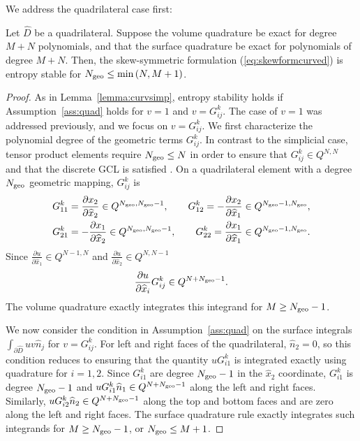 \documentclass{svjour3}                     %
\renewcommand{\hat}{\widehat}
\newcommand{\pd}[2]{\frac{\partial#1}{\partial#2}}
\newcommand{\LRp}[1]{\left( #1 \right)}
\begin{document}
We address the quadrilateral case first:
\begin{lemma}
Let $\hat{D}$ be a quadrilateral.  Suppose the volume quadrature be exact for degree $M+N$ polynomials, and that the surface quadrature be exact for polynomials of degree $M+N$.  Then, the skew-symmetric formulation (\ref{eq:skewformcurved}) is entropy stable for $N_{\rm geo} \leq \min\LRp{N,M+1}$.
\label{lemma:curvquad}
\end{lemma}
\begin{proof}
As in Lemma~\ref{lemma:curvsimp}, entropy stability holds if Assumption~\ref{ass:quad} holds for $v = 1$ and $v = G^k_{ij}$.  The case of $v = 1$ was addressed previously, and we focus on $v = G^k_{ij}$.  We first characterize the polynomial degree of the geometric terms $G^k_{ij}$.  In contrast to the simplicial case, tensor product elements require $N_{\rm geo}\leq N$ in order to ensure that $G^k_{ij}\in Q^{N,N}$ and that the discrete GCL is satisfied \cite{kopriva2006metric}.  On a quadrilateral element with a degree $N_{\rm geo}$ geometric mapping, $G^k_{ij}$ is
\begin{align*}
G^k_{11} &= \pd{x_2}{\hat{x}_2} \in Q^{N_{\rm geo}, N_{\rm geo}-1}, \qquad G^k_{12} = -\pd{x_2}{\hat{x}_1} \in Q^{N_{\rm geo}-1, N_{\rm geo}},\\
G^k_{21} &= -\pd{x_1}{\hat{x}_2} \in Q^{N_{\rm geo}, N_{\rm geo}-1}, \qquad G^k_{22} = \pd{x_1}{\hat{x}_1}\in Q^{N_{\rm geo}-1, N_{\rm geo}}.\nonumber
\end{align*}
Since $\pd{u}{\hat{x}_1} \in Q^{N-1,N}$ and $\pd{u}{\hat{x}_2} \in Q^{N,N-1}$
\[
\pd{u}{\hat{x}_i}G^k_{ij} \in Q^{N+N_{\rm geo}-1}.%
\]
The volume quadrature exactly integrates this integrand for $M \geq N_{\rm geo}-1$.

We now consider the condition in Assumption~\ref{ass:quad} on the surface integrals $\int_{\partial \hat{D}} u v \hat{n}_j$ for $v= G^k_{ij}$.  For left and right faces of the quadrilateral, $\hat{n}_2 = 0$, so this condition reduces to ensuring that the quantity $u G^k_{i1}$ is integrated exactly using quadrature for $i = 1,2$.  Since $G^k_{i1}$ are degree $N_{\rm geo}-1$ in the $\hat{x}_2$ coordinate, $G^k_{i1}$ is degree $N_{\rm geo}-1$ and $uG^k_{i1} \hat{n}_1 \in Q^{N+N_{\rm geo}-1}$ along the left and right faces.  Similarly, $uG^k_{i2} \hat{n}_2 \in Q^{N+N_{\rm geo}-1}$ along the top and bottom faces and are zero along the left and right faces.  The surface quadrature rule exactly integrates such integrands for $M \geq N_{\rm geo} - 1$, or $N_{\rm geo} \leq M+1$.
\end{proof}
\end{document}
